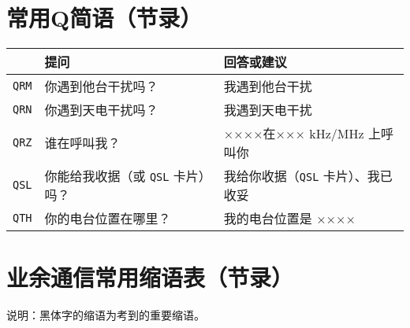 \newpage

\section{常用Q简语（节录）}

\begin{longtable}{|l|l|l|}
	\hline
	    & \textbf{提问} & \textbf{回答或建议} \\
	\hline
	\texttt{QRM} & 你遇到他台干扰吗？ & 我遇到他台干扰 \\
	\hline
	\texttt{QRN} & 你遇到天电干扰吗？ & 我遇到天电干扰 \\
	\hline
	\texttt{QRZ} & 谁在呼叫我？ &  ××××在××× \si{\kHz}/\si{\MHz} 上呼叫你 \\
	\hline
	\texttt{QSL} & 你能给我收据（或 \texttt{QSL} 卡片）吗？ & 我给你收据（\texttt{QSL} 卡片）、我已收妥 \\
	\hline
	\texttt{QTH} & 你的电台位置在哪里？ & 我的电台位置是 ×××× \\
	\hline
\end{longtable}

\newpage



\section{业余通信常用缩语表（节录）}

说明：黑体字的缩语为考到的重要缩语。

